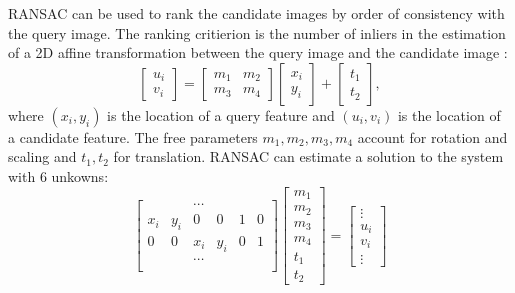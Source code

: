 RANSAC can be used to rank the candidate images by order of consistency with the query image. The ranking critierion is the number of inliers in the estimation of a 2D affine transformation between the query image and the candidate image \cite{ransac_gcc}:
\begin{equation}
\begin{bmatrix}
u_i \\ v_i
\end{bmatrix}
=
\begin{bmatrix}
m_1 & m_2 \\
m_3 & m_4
\end{bmatrix}
\begin{bmatrix}
x_i \\ y_i
\end{bmatrix}
+
\begin{bmatrix}
t_1 \\ t_2
\end{bmatrix},
\end{equation}
where $(x_i,y_i)$ is the location of a query feature and $(u_i,v_i)$ is the location of a candidate feature. The free parameters $m_1,m_2,m_3,m_4$ account for rotation and scaling and $t_1,t_2$ for translation. RANSAC can estimate a solution to the system with 6 unkowns:
\begin{equation}
\begin{bmatrix}
 & & \cdots \\
x_i & y_i & 0 & 0 & 1 & 0 \\
0 & 0 & x_i & y_i & 0 & 1 \\
 & & \cdots \\
\end{bmatrix}
\begin{bmatrix}
m_1 \\ m_2 \\ m_3 \\ m_4 \\ t_1 \\ t_2
\end{bmatrix}
=
\begin{bmatrix}
\vdots \\
u_i \\
v_i \\
\vdots
\end{bmatrix}
\end{equation}
